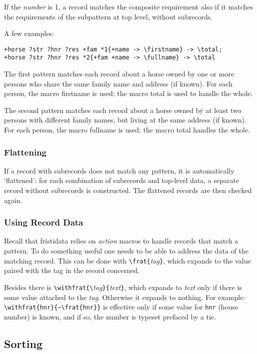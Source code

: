 \documentclass[11pt]{article}
\makeatletter
\def\macroname#1{{\ttfamily\@ttbs#1}}  %
\def\envirname#1{{\ttfamily #1}}       %
\def\={\verb=}
\def\<#1>{\macroname{#1}}
\makeatother
\begin{document}
If the \textit{number} is 1, a record matches the composite requirement
also if it matches the requirements of the subpattern at top level,
without subrecords.

A few examples:
\begin{verbatim}
+horse ?str ?hnr ?res +fam *1{+name -> \firstname} -> \total;
+horse ?str ?hnr ?res *2{+fam +name -> \fullname} -> \total
\end{verbatim}
The first pattern matches each record about a horse owned by one
or more persons who share the same family name and address (if
known). For each person, the macro \<firstname> is used; the macro
\<total> is used to handle the whole.

The second pattern matches each record about a horse owned
by at least two persons with different family names, but living at
the same address (if known). For each person, the macro \<fullname>
is used; the macro \<total> handles the whole.

\subsubsection{Flattening}

If a record with subrecords does not match any pattern, it is
automatically `flattened': for each combination of subrecords and
top-level data, a separate record without subrecords is constructed.
The flattened records are then checked again.

\subsubsection{Using Record Data}\label{sec:urd}

Recall that \envirname{fristidata} relies on \textit{action} macros
to handle records that match a pattern. To do something useful one
needs to be able to address the data of the matching record. This can be done
with \=\frat{=\textit{tag}\=}=, which expands to the value paired
with the tag in the record concerned.

Besides there is \=\withfrat{\=\textit{tag}\=}{=\textit{text}\=}=,
which expands to \textit{text} only if there is some value
attached to the \textit{tag}. Otherwise it expands to nothing.
For example: \=\withfrat{hnr}{~\frat{hnr}}= is effective only
if some value for \texttt{hnr} (house number) is known, and if
so, the number is typeset prefaced by a tie.

\subsection{Sorting}
\end{document}

